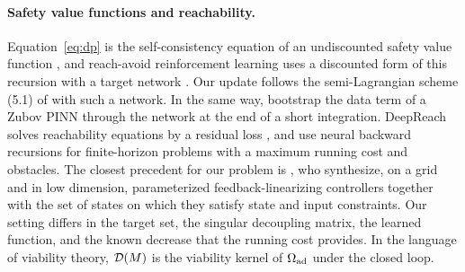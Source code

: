 \paragraph{Safety value functions and reachability.} Equation~\eqref{eq:dp} is the self-consistency equation of an undiscounted safety value function \citep{yu2022}, and reach-avoid reinforcement learning uses a discounted form of this recursion with a target network \citep{hsu2021}. Our update follows the semi-Lagrangian scheme (5.1) of \citet{gruene2015} with such a network. In the same way, \citet{li2025} bootstrap the data term of a Zubov PINN through the network at the end of a short integration. DeepReach solves reachability equations by a residual loss \citep{bansal2021}, and \citet{bokanowski2023} use neural backward recursions for finite-horizon problems with a maximum running cost and obstacles. The closest precedent for our problem is \citet{oishi2006}, who synthesize, on a grid and in low dimension, parameterized feedback-linearizing controllers together with the set of states on which they satisfy state and input constraints. Our setting differs in the target set, the singular decoupling matrix, the learned function, and the known decrease that the running cost provides. In the language of viability theory, $\mathcal D(M)$ is the viability kernel of $\Omega_{\mathrm{ad}}$ under the closed loop.

